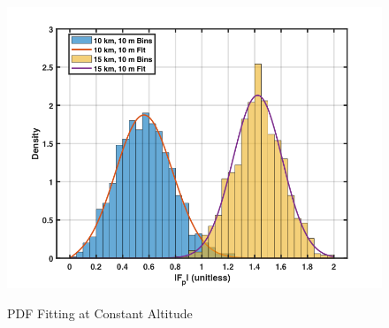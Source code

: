 \begin{figure}[H]
  \begin{center}
\includegraphics[width=5in]{../media/statistics/constant_altitude_fit.png}
  \end{center}
  \renewcommand{\baselinestretch}{1} \small\normalsize
  \begin{quote}
    \caption[PDF Fitting at Constant Altitude]{PDF Fitting at Constant Altitude\label{stat_fig:5}}
  \end{quote}
\end{figure}
\renewcommand{\baselinestretch}{2} \small\normalsize

